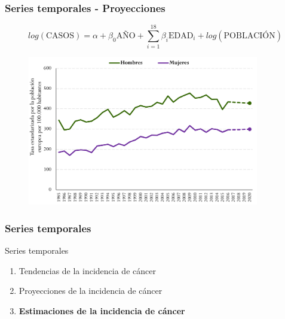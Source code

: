 \documentclass{beamer}
\begin{document}
\begin{frame}\frametitle{Series temporales - Proyecciones}
	\vspace{-20pt}
	\centering
	$$log(\text{CASOS}) = \alpha + \beta_0 \text{AÑO} + \sum_{i = 1}^{18} \beta_i \text{EDAD}_i + log(\text{POBLACIÓN})$$
	\vspace{-10pt}
	\begin{figure}
		\centering
		\includegraphics[width=0.9\textwidth]{images/proyecciones1.png}
	\end{figure}
\end{frame}


\begin{frame}\frametitle{Series temporales}
	\begin{block}{Series temporales}
		\begin{enumerate}
			\item Tendencias de la incidencia de cáncer\\[2ex]
			\item Proyecciones de la incidencia de cáncer\\[2ex]
			\item \textbf{Estimaciones de la incidencia de cáncer}\\[2ex]
		\end{enumerate}
	\end{block}
\end{frame}

\end{document}
